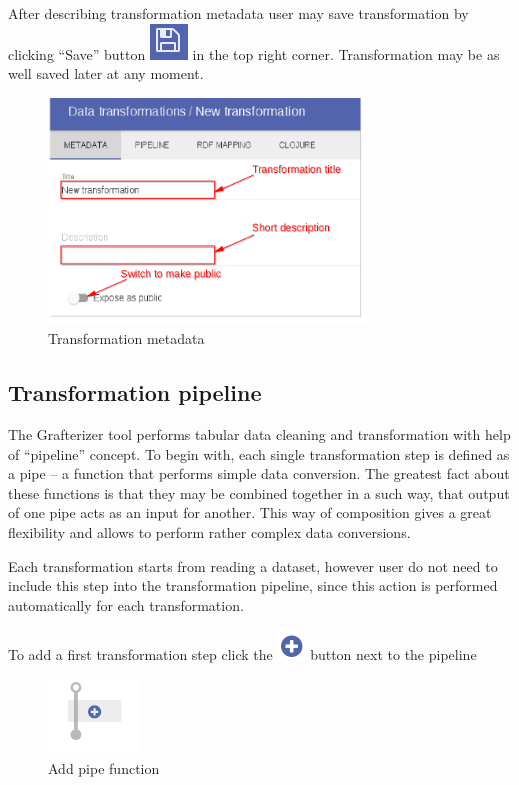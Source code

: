\documentclass[USenglish]{article}
\begin{document}
After describing transformation metadata user may save transformation by clicking “Save” button {\includegraphics[scale=0.8]{save.png}} in the top right corner. Transformation may be as well saved later at any moment.


\begin{center}
\begin{figure}[!htbp]
\centering
\includegraphics[height=6cm] {meta.png}
 \caption{Transformation metadata \label{meta}}
\end{figure}
\end{center}

\subsection{Transformation pipeline}
The Grafterizer tool performs tabular data cleaning and transformation with help of “pipeline” concept.  To begin with, each single transformation step is defined as a pipe – a function that performs simple data conversion. The greatest fact about these functions is that they may be combined together in a such way, that output of one pipe acts as an input for another. This way of composition gives a great flexibility and allows to perform rather complex data conversions.

Each transformation starts from reading a dataset, however user do not need to include this step into the transformation pipeline, since this action is performed automatically for each transformation.

To add a first transformation step click the {\includegraphics[scale=0.8]{add.png}} button next to the pipeline
\begin{center}
\begin{figure}[!htbp]
\centering
\includegraphics[height=2cm] {addpipefunction.png}
 \caption{Add pipe function \label{meta}}
\end{figure}
\end{center}
\end{document}
